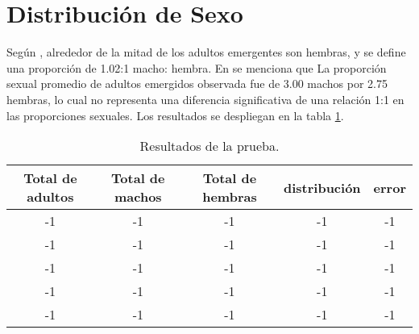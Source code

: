 \section{Distribución de Sexo}
Según \cite{otero2006stochastic}, alrededor de la mitad de los adultos emergentes son hembras, 
y se define una proporción de 1.02:1 macho: hembra. En \cite{manrique1998desarrollo} se menciona que
La proporción sexual promedio de adultos emergidos observada fue de 3.00 machos por 2.75 hembras, lo cual
no representa una diferencia significativa de una relación 1:1 en las proporciones sexuales. Los
 resultados se despliegan en la tabla \ref{tab:distribucion-sexo-test}.

\begin{table}
\begin{center}
\begin{tabular}{c c c c c }
Total de adultos & Total de machos & Total de hembras & distribución & error\\
\hline
-1  & -1  & -1 & -1 & -1   \\
-1  & -1  & -1 & -1 & -1   \\
-1  & -1  & -1 & -1 & -1   \\
-1  & -1  & -1 & -1 & -1   \\
-1  & -1  & -1 & -1 & -1   \\
\end{tabular}
\caption{ \label{tab:distribucion-sexo-test} Resultados de la prueba.}
\end{center}
\end{table}
